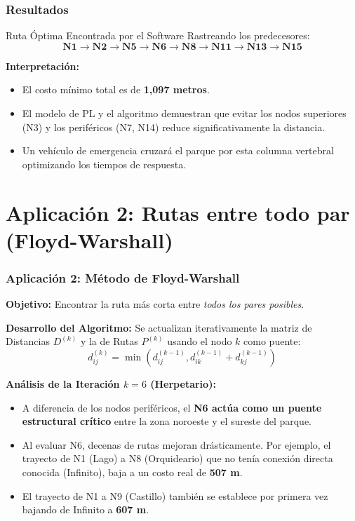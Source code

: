\documentclass[aspectratio=169]{beamer}
\begin{document}
\begin{frame}
    \frametitle{Resultados}
    \begin{block}{Ruta Óptima Encontrada por el Software}
        Rastreando los predecesores: 
        $$\mathbf{N1 \rightarrow N2 \rightarrow N5 \rightarrow N6 \rightarrow N8 \rightarrow N11 \rightarrow N13 \rightarrow N15}$$
    \end{block}
    
    \vspace{2mm}
    \textbf{Interpretación:}
    \begin{itemize}
        \item El costo mínimo total es de \textbf{1,097 metros}.
        \item El modelo de PL y el algoritmo demuestran que evitar los nodos superiores (N3) y los periféricos (N7, N14) reduce significativamente la distancia.
        \item Un vehículo de emergencia cruzará el parque por esta columna vertebral optimizando los tiempos de respuesta.
    \end{itemize}
\end{frame}


\section{Aplicación 2: Rutas entre todo par (Floyd-Warshall)}

\begin{frame}
    \frametitle{Aplicación 2: Método de Floyd-Warshall}
    \textbf{Objetivo:} Encontrar la ruta más corta entre \textit{todos los pares posibles}.
    
    
    \vspace{2mm}
    \textbf{Desarrollo del Algoritmo:}
    Se actualizan iterativamente la matriz de Distancias $D^{(k)}$ y la de Rutas $P^{(k)}$ usando el nodo $k$ como puente:
    $$d_{ij}^{(k)} = \min \left( d_{ij}^{(k-1)}, d_{ik}^{(k-1)} + d_{kj}^{(k-1)} \right)$$
    
    \textbf{Análisis de la Iteración $k=6$ (Herpetario):}
    \begin{itemize}
        \item A diferencia de los nodos periféricos, el \textbf{N6 actúa como un puente estructural crítico} entre la zona noroeste y el sureste del parque.
        \item Al evaluar N6, decenas de rutas mejoran drásticamente. Por ejemplo, el trayecto de N1 (Lago) a N8 (Orquideario) que no tenía conexión directa conocida (Infinito), baja a un costo real de \textbf{507 m}.
        \item El trayecto de N1 a N9 (Castillo) también se establece por primera vez bajando de Infinito a \textbf{607 m}.
    \end{itemize}
\end{frame}
\end{document}
